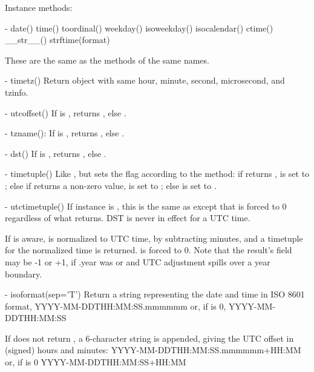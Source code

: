 Instance methods:

  - date()
    time()
    toordinal()
    weekday()
    isoweekday()
    isocalendar()
    ctime()
    __str__()
    strftime(format)

    These are the same as the  methods of the same names.

  - timetz()
    Return  object with same hour, minute, second, microsecond,
    and tzinfo.

  - utcoffset()
    If  is , returns , else
    .

  - tzname():
    If  is , returns , else
    .

  - dst()
    If  is , returns , else
    .

  - timetuple()
    Like , but sets the
     flag according to the  method:  if
     returns ,  is set to
    ; else if  returns a non-zero value,
     is set to ; else  is set
    to .

  - utctimetuple()
    If  instance  is \naive, this is the same as
     except that  is forced to 0
    regardless of what  returns.  DST is never in effect
    for a UTC time.

    If  is aware,  is normalized to UTC time, by subtracting
     minutes, and a timetuple for the
    normalized time is returned.   is forced to 0.
    Note that the result's  field may be
    -1 or +1, if .year was
     or  and UTC adjustment spills over a
    year boundary.

  - isoformat(sep='T')
    Return a string representing the date and time in ISO 8601 format,
        YYYY-MM-DDTHH:MM:SS.mmmmmm
    or, if  is 0,
        YYYY-MM-DDTHH:MM:SS

    If  does not return , a 6-character
    string is appended, giving the UTC offset in (signed) hours and
    minutes:
        YYYY-MM-DDTHH:MM:SS.mmmmmm+HH:MM
    or, if  is 0
        YYYY-MM-DDTHH:MM:SS+HH:MM

